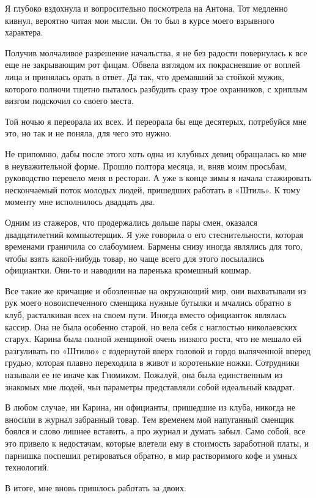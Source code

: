 \documentclass[
]{book}
\begin{document}
Я глубоко вздохнула и вопросительно посмотрела на Антона. Тот медленно кивнул, вероятно читая мои мысли. Он то был в курсе моего взрывного характера.

Получив молчаливое разрешение начальства, я не без радости повернулась к все еще не закрывающим рот фицам. Обвела взглядом их покрасневшие от воплей лица и принялась орать в ответ. Да так, что дремавший за стойкой мужик, которого полночи тщетно пыталось разбудить сразу трое охранников, с хриплым визгом подскочил со своего места.

Той ночью я переорала их всех. И переорала бы еще десятерых, потребуйся мне это, но так и не поняла, для чего это нужно.

Не припомню, дабы после этого хоть одна из клубных девиц обращалась ко мне в неуважительной форме. Прошло полтора месяца, и, вняв моим просьбам, руководство перевело меня в ресторан. А уже в конце зимы я начала стажировать нескончаемый поток молодых людей, пришедших работать в «Штиль». К тому моменту мне исполнилось двадцать два.

Одним из стажеров, что продержались дольше пары смен, оказался двадцатилетний компьютерщик. Я уже говорила о его стеснительности, которая временами граничила со слабоумием. Бармены снизу иногда являлись для того, чтобы взять какой-нибудь товар, но чаще всего для этого посылались официантки. Они-то и наводили на паренька кромешный кошмар.

Все такие же кричащие и обозленные на окружающий мир, они выхватывали из рук моего новоиспеченного сменщика нужные бутылки и мчались обратно в клуб, расталкивая всех на своем пути. Иногда вместо официанток являлась кассир. Она не была особенно старой, но вела себя с наглостью николаевских старух. Карина была полной женщиной очень низкого роста, что не мешало ей разгуливать по «Штилю» с вздернутой вверх головой и гордо выпяченной вперед грудью, которая плавно переходила в живот и коротенькие ножки. Сотрудники называли ее не иначе как Гномиком. Пожалуй, она была единственным из знакомых мне людей, чьи параметры представляли собой идеальный квадрат.

В любом случае, ни Карина, ни официанты, пришедшие из клуба, никогда не вносили в журнал забранный товар. Тем временем мой напуганный сменщик боялся и слово лишнее вставить, а про журнал и думать забыл. Само собой, все это привело к недостачам, которые влетели ему в стоимость заработной платы, и парнишка поспешил ретироваться обратно, в мир растворимого кофе и умных технологий.

В итоге, мне вновь пришлось работать за двоих.
\end{document}
